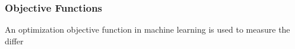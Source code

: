 \subsubsection{Objective Functions}
An optimization objective function in machine learning is used to measure the differ